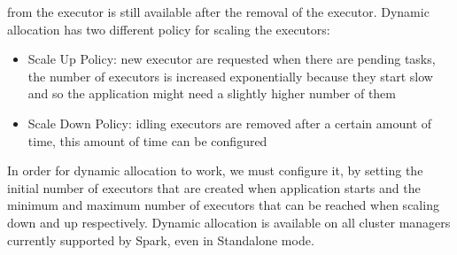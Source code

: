 from the executor is still available after the removal of the executor.
Dynamic allocation has two different policy for scaling the executors:
\begin{itemize}
	\item Scale Up Policy: new executor are requested when there are
	pending tasks, the number of executors is increased exponentially
	because they start slow and so the application might need
	a slightly higher number of them
	\item Scale Down Policy: idling executors are removed after a certain
	amount of time, this amount of time can be configured
\end{itemize}
In order for dynamic allocation to work, we must configure it, by setting
the initial number of executors that are created when application
starts and the minimum and maximum number of executors that can
be reached when scaling down and up respectively. Dynamic allocation
is available on all cluster managers currently supported by Spark,
even in Standalone mode.

